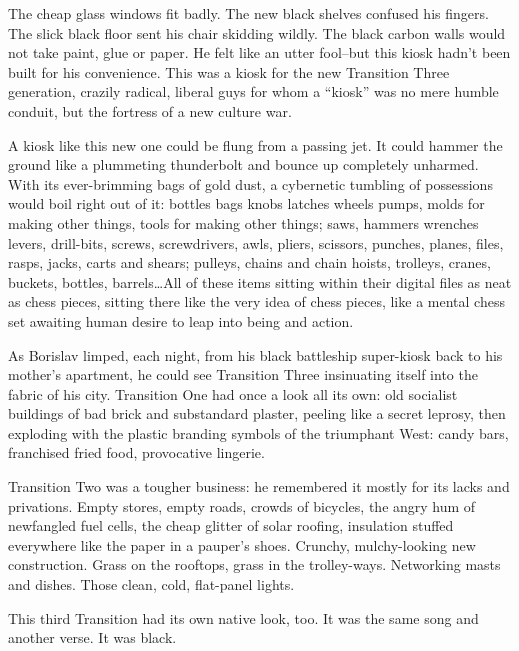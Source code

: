 \documentclass[20 pt,twoside,extrafontsizes,final]{memoir}
\begin{document}
The cheap glass windows fit badly. The new black shelves confused his fingers. The slick black floor sent his chair skidding wildly. The black carbon walls would not take paint, glue or paper. He felt like an utter fool--but this kiosk hadn't been built for his convenience. This was a kiosk for the new Transition Three generation, crazily radical, liberal guys for whom a ``kiosk'' was no mere humble conduit, but the fortress of a new culture war.

A kiosk like this new one could be flung from a passing jet. It could hammer the ground like a plummeting thunderbolt and bounce up completely unharmed. With its ever-brimming bags of gold dust, a cybernetic tumbling of possessions would boil right out of it: bottles bags knobs latches wheels pumps, molds for making other things, tools for making other things; saws, hammers wrenches levers, drill-bits, screws, screwdrivers, awls, pliers, scissors, punches, planes, files, rasps, jacks, carts and shears; pulleys, chains and chain hoists, trolleys, cranes, buckets, bottles, barrels\dots All of these items sitting within their digital files as neat as chess pieces, sitting there like the very idea of chess pieces, like a mental chess set awaiting human desire to leap into being and action. 

As Borislav limped, each night, from his black battleship super-kiosk back to his mother's apartment, he could see Transition Three insinuating itself into the fabric of his city.
Transition One had once a look all its own: old socialist buildings of bad brick and substandard plaster, peeling like a secret leprosy, then exploding with the plastic branding symbols of the triumphant West: candy bars, franchised fried food, provocative lingerie.

Transition Two was a tougher business: he remembered it mostly for its lacks and privations. Empty stores, empty roads, crowds of bicycles, the angry hum of newfangled fuel cells, the cheap glitter of solar roofing, insulation stuffed everywhere like the paper in a pauper's shoes. Crunchy, mulchy-looking new construction. Grass on the rooftops, grass in the trolley-ways. Networking masts and dishes. Those clean, cold, flat-panel lights.

 This third Transition had its own native look, too. It was the same song and another verse. It was black.
 
\end{document}
